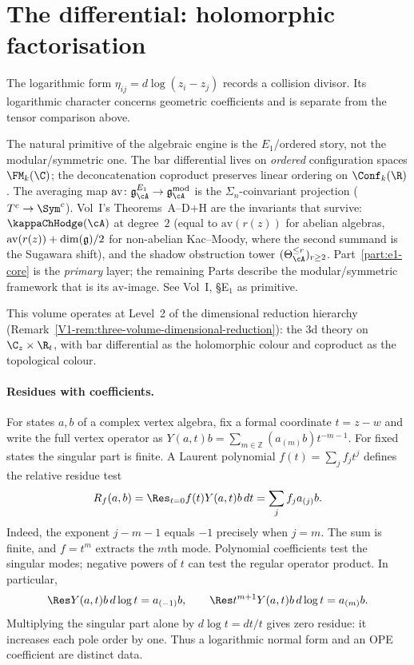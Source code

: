 \section*{The differential: holomorphic factorisation}

The logarithmic form $\eta_{ij}=d\log(z_i-z_j)$ records a
collision divisor. Its logarithmic character concerns geometric
coefficients and is separate from the tensor comparison above.

\begin{remark}[$E_1$ primacy]
\label{rem:vol2-e1-primacy}
The natural primitive of the algebraic engine is the
$E_1$/ordered story, not the modular/symmetric one. The bar
differential lives on \emph{ordered} configuration spaces
$\FM_k(\C)$; the deconcatenation coproduct preserves linear
ordering on $\Conf_k(\R)$. The averaging map
$\mathrm{av}\colon \mathfrak{g}^{E_1}_\cA \to
\mathfrak{g}^{\mathrm{mod}}_\cA$ is the
$\Sigma_n$-coinvariant projection
($T^c \to \Sym^c$). Vol~I's Theorems~A--D$+$H are the invariants
that survive: $\kappaChHodge(\cA)$ at degree~$2$
(equal to $\mathrm{av}(r(z))$ for abelian algebras,
$\mathrm{av}(r(z)) + \dim(\mathfrak{g})/2$ for non-abelian Kac--Moody,
where the second summand is the Sugawara shift), and the shadow
obstruction tower $(\Theta_\cA^{\le r})_{r \ge 2}$.
Part~\ref{part:e1-core} is the \emph{primary} layer; the
remaining Parts describe the modular/symmetric framework that is
its $\mathrm{av}$-image.
See Vol~I, \S\textup{E$_1$ as primitive}.
\end{remark}

\begin{remark}
\label{rem:vol2-dimensional-reduction}
This volume operates at Level~2 of the dimensional reduction
hierarchy (Remark~\ref*{V1-rem:three-volume-dimensional-reduction}):
the 3d theory on $\C_z \times \R_t$, with bar differential as
the holomorphic colour and coproduct as the topological colour.
\end{remark}

\paragraph{Residues with coefficients.}
For states $a,b$ of a complex vertex algebra, fix a formal
coordinate $t=z-w$ and write the full vertex operator
as $Y(a,t)b=\sum_{m\in\mathbb Z}(a_{(m)}b)t^{-m-1}$.
For fixed states the singular part is finite. A Laurent polynomial
$f(t)=\sum_j f_jt^j$ defines the relative residue test
\begin{equation}\label{eq:intro-residue-test}
 R_f(a,b)=\Res_{t=0}f(t)Y(a,t)b\,dt
         =\sum_j f_j a_{(j)}b.
\end{equation}
Indeed, the exponent $j-m-1$ equals $-1$ precisely when $j=m$.
The sum is finite, and $f=t^m$ extracts the $m$th mode.
Polynomial coefficients test the singular modes; negative powers
of $t$ can test the regular operator product. In particular,
\[
 \Res Y(a,t)b\,d\log t=a_{(-1)}b,\qquad
 \Res t^{m+1}Y(a,t)b\,d\log t=a_{(m)}b.
\]
Multiplying the singular part alone by $d\log t=dt/t$ gives
zero residue: it increases each pole order by one. Thus a
logarithmic normal form and an OPE coefficient are distinct data.


